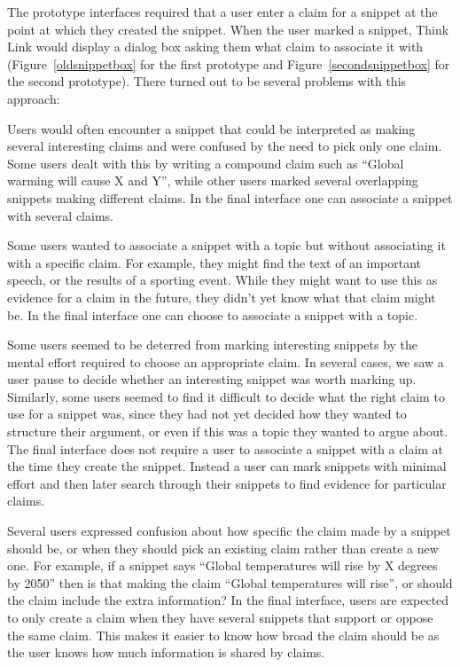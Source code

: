 \documentclass{chi2009}
\begin{document}
The prototype interfaces required that a user enter a claim for a snippet at the point at which they created the snippet. When the user marked a snippet, Think Link would display a dialog box asking them what claim to associate it with (Figure~\ref{oldsnippetbox} for the first prototype and Figure~\ref{secondsnippetbox} for the second prototype). There turned out to be several problems with this approach:

Users would often encounter a snippet that could be interpreted as making several interesting claims and were confused by the need to pick only one claim. Some users dealt with this by writing a compound claim such as ``Global warming will cause X and Y'', while other users marked several overlapping snippets making different claims. In the final interface one can associate a snippet with several claims.

Some users wanted to associate a snippet with a topic but without associating it with a specific claim. For example, they might find the text of an important speech, or the results of a sporting event. While they might want to use this as evidence for a claim in the future, they didn't yet know what that claim might be. In the final interface one can choose to associate a snippet with a topic.

Some users seemed to be deterred from marking interesting snippets by the mental effort required to choose an appropriate claim. In several cases, we saw a user pause to decide whether an interesting snippet was worth marking up. Similarly, some users seemed to find it difficult to decide what the right claim to use for a snippet was, since they had not yet decided how they wanted to structure their argument, or even if this was a topic they wanted to argue about. The final interface does not require a user to associate a snippet with a claim at the time they create the snippet. Instead a user can mark snippets with minimal effort and then later search through their snippets to find evidence for particular claims.

Several users expressed confusion about how specific the claim made by a snippet should be, or when they should pick an existing claim rather than create a new one. For example, if a snippet says ``Global temperatures will rise by X degrees by 2050'' then is that making the claim ``Global temperatures will rise'', or should the claim include the extra information? In the final interface, users are expected to only create a claim when they have several snippets that support or oppose the same claim. This makes it easier to know how broad the claim should be as the user knows how much information is shared by claims.
\end{document}
